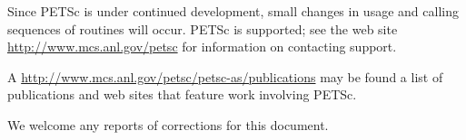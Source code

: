 Since PETSc is under continued development, small changes in usage and
calling sequences of routines will occur.  PETSc is supported; see the
web site \href{http://www.mcs.anl.gov/petsc}{http://www.mcs.anl.gov/petsc} for information on
contacting support.

A \href{http://www.mcs.anl.gov/petsc/petsc-as/publications}{http://www.mcs.anl.gov/petsc/petsc-as/publications} may be found 
a list of publications and web sites that feature work involving PETSc.


We welcome any reports of corrections for this document.

\medskip \medskip



